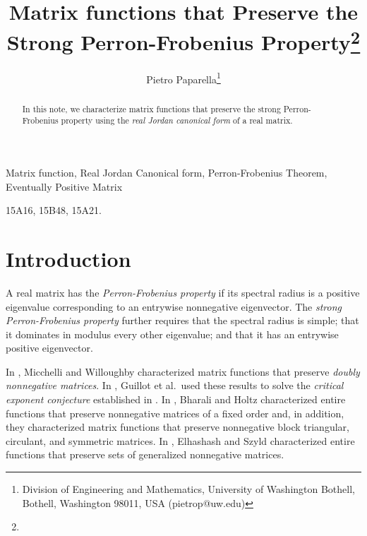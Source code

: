 \documentclass[10pt,twoside,leqno]{siamltex}
\begin{document}
\title{Matrix functions that Preserve the Strong Perron-Frobenius Property\thanks{}}

\author{
Pietro Paparella\thanks{Division of Engineering and Mathematics, University of Washington Bothell, Bothell, Washington 98011, USA (pietrop@uw.edu)}
}

\pagestyle{myheadings}
\maketitle

\begin{abstract}
In this note, we characterize matrix functions that preserve the strong Perron-Frobenius property using the \textit{real Jordan canonical form} of a real matrix.  
\end{abstract}

\begin{keywords}
Matrix function, Real Jordan Canonical form, Perron-Frobenius Theorem, Eventually Positive Matrix
\end{keywords}

\begin{AMS}
15A16, 15B48, 15A21.
\end{AMS}

\section{Introduction}

A real matrix has the \textit{Perron-Frobenius property} if its spectral radius is a positive eigenvalue corresponding to an entrywise nonnegative eigenvector. The \textit{strong Perron-Frobenius property} further requires that the spectral radius is simple; that it dominates in modulus every other eigenvalue; and that it has an entrywise positive eigenvector.

In \cite{mw1979}, Micchelli and Willoughby characterized matrix functions that preserve \textit{doubly nonnegative matrices}. In \cite{gkr2013}, Guillot et al.~used these results to solve the \textit{critical exponent conjecture} established in \cite{jlw2011}. In \cite{bh2008}, Bharali and Holtz characterized entire functions that preserve nonnegative matrices of a fixed order and, in addition, they characterized matrix functions that preserve nonnegative block triangular, circulant, and symmetric matrices. In \cite{es2010}, Elhashash and Szyld characterized entire functions that preserve sets of generalized nonnegative matrices. 
\end{document}
